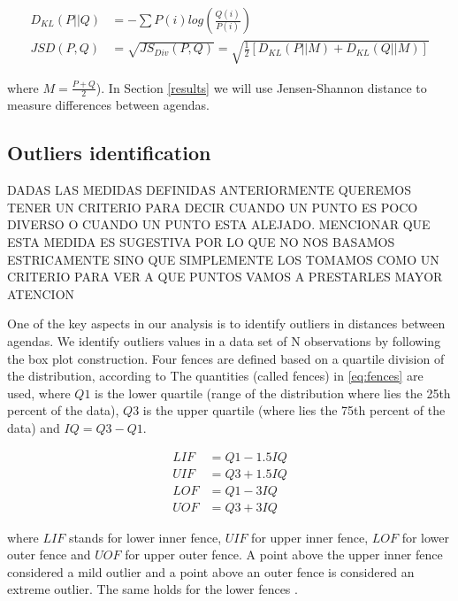 \documentclass{bmcart}
\begin{document}
\begin{eqnarray}\label{eq:jensen_shannon_distance}
D_{KL}(P||Q) &= -\sum{P(i) log(\frac{Q(i)}{P(i)})} \nonumber \\
JSD(P,Q) &= \sqrt{JS_{Div}(P,Q)} = \sqrt{\frac{1}{2}[D_{KL}(P||M) + D_{KL}(Q||M)] } 
\end{eqnarray}

where $M = \frac{P + Q}{2}$). In Section \ref{results} we will use Jensen-Shannon distance to measure differences between agendas.

\subsection*{Outliers identification}

DADAS LAS MEDIDAS DEFINIDAS ANTERIORMENTE QUEREMOS TENER UN CRITERIO PARA DECIR CUANDO UN PUNTO ES POCO DIVERSO O CUANDO UN PUNTO ESTA ALEJADO.
MENCIONAR QUE ESTA MEDIDA ES SUGESTIVA POR LO QUE NO NOS BASAMOS ESTRICAMENTE SINO QUE SIMPLEMENTE LOS TOMAMOS COMO UN CRITERIO PARA VER A QUE PUNTOS VAMOS A PRESTARLES MAYOR ATENCION


\label{sec:outliers_identification}
\par One of the key aspects in our analysis is to identify outliers in distances between agendas. We identify outliers values in a data set of N observations by following the box plot construction.
Four fences are defined based on a quartile division of the distribution, according to 
The quantities (called fences) in \ref{eq:fences} are used, where $Q1$ is the lower quartile (range of the distribution where lies the 25th percent of the data), $Q3$ is the upper quartile (where lies the 75th percent of the data) and $IQ = Q3 - Q1$.

\begin{eqnarray}\label{eq:fences}
LIF & = Q1 - 1.5 IQ \nonumber \\
UIF & = Q3 + 1.5  IQ \nonumber\\
LOF & = Q1 - 3  IQ \nonumber \\
UOF & = Q3 + 3 IQ
\end{eqnarray}

\par where $LIF$ stands for lower inner fence, $UIF$ for upper inner fence, $LOF$ for lower outer fence and $UOF$ for upper outer fence. A point above the upper inner fence considered a mild outlier and a point above an outer fence is considered an extreme outlier. The same holds for the lower fences \cite{natrella2010nist}. 
\end{document}
